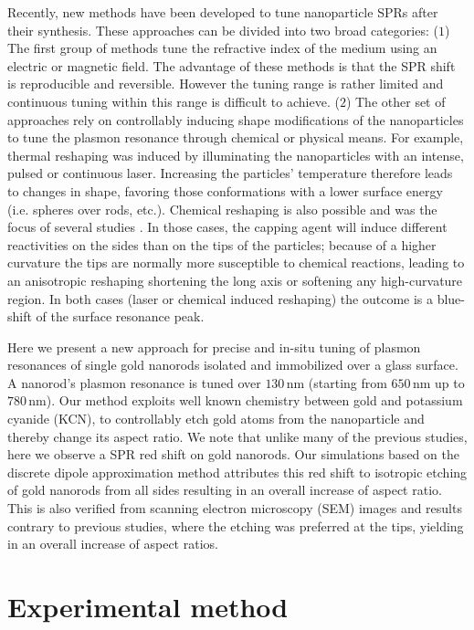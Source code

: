 \documentclass[a4paper,oneside,onecolumn]{article}
\newcommand{\nm}{\ensuremath{\,\textrm{nm}}}
\begin{document}
Recently, new methods have been developed to tune nanoparticle SPRs after their
synthesis. These approaches can be divided into two broad categories: ($1$) The
first group of methods tune the refractive index of the medium using an electric
or magnetic field\cite{Kossyrev2005}. The advantage of these methods is that the
SPR shift is reproducible and reversible. However the tuning range is rather
limited and continuous tuning within this range is difficult to achieve.
($2$) The other set of approaches rely on controllably inducing shape
modifications of the nanoparticles to tune the plasmon resonance through
chemical or physical means. For example, thermal reshaping was induced by
illuminating the nanoparticles with an intense, pulsed
\cite{Link2000}\cite{Horiguchi2008} or continuous laser\cite{Yorulmaz2012}.
Increasing the particles' temperature therefore leads to changes in shape,
favoring those conformations with a lower surface energy (i.e.
spheres over rods, etc.). Chemical reshaping is also possible and was the focus
of several studies\cite{Carbo-Argibay2007}
\cite{Rodriguez-Fernandez2005} \cite{Jana2002}. In those cases, the capping
agent will induce different reactivities on the sides than on the tips of the
particles; because of a higher curvature\cite{Yuan2015} the tips are
normally more susceptible to chemical reactions, leading to an anisotropic reshaping
shortening the long axis or softening any high-curvature region. In both cases
(laser or chemical induced reshaping) the outcome is a blue-shift of the surface
resonance peak.

Here we present a new approach for precise and in-situ tuning of plasmon
resonances of single gold nanorods isolated and immobilized over a glass
surface. A nanorod's plasmon resonance is tuned over $130\nm$ (starting from
$650\nm$ up to $780\nm$). Our method exploits well known chemistry between gold
and potassium cyanide (KCN), to controllably etch gold atoms from the
nanoparticle and thereby change its aspect ratio. We note that unlike many of
the previous studies, here we observe a SPR red shift on gold nanorods.
Our simulations based on the discrete dipole approximation method attributes
this red shift to isotropic etching of gold nanorods from all sides resulting in
an overall increase of aspect ratio.  This is also verified from scanning
electron microscopy (SEM) images and results contrary to previous studies, where
the etching was preferred at the tips, yielding in an overall increase of
aspect ratios.

\section{Experimental method}
\end{document}
